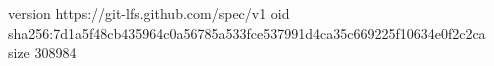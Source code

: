 version https://git-lfs.github.com/spec/v1
oid sha256:7d1a5f48cb435964c0a56785a533fce537991d4ca35c669225f10634e0f2c2ca
size 308984
